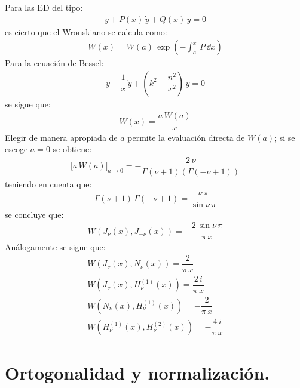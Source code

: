 Para las ED del tipo:
\begin{align*}
\ddot{y} + P(x) \, \dot{y} + Q(x) \, y = 0
\end{align*}
es cierto que el Wronskiano se calcula como:
\begin{align*}
W(x) = W(a) \, \exp(- \int_{a}^{x} \, P \, \dd x)
\end{align*}
Para la ecuación de Bessel:
\begin{align*}
\ddot{y} + \dfrac{1}{x} \, \dot{y} + \left( k^{2} - \dfrac{n^{2}}{x^{2}} \right) \, y = 0
\end{align*}
se sigue que:
\begin{align*}
W(x) = \dfrac{a \, W(a)}{x}
\end{align*}
Elegir de manera apropiada de $a$ permite la evaluación directa de $W(a)$; si se escoge $a=0$ se obtiene:
\begin{align*}
\big[ a \, W(a) \big]_{a \to 0} =  - \dfrac{2 \, \nu}{\Gamma(\nu + 1)(\Gamma (-\nu +1))}
\end{align*}
teniendo en cuenta que:
\begin{align*}
\Gamma (\nu + 1) \, \Gamma (-\nu + 1) = \dfrac{\nu \, \pi}{\sin \nu \,\pi }
\end{align*}
se concluye que:
\begin{align*}
W (J_{\nu} (x), J_{-\nu} (x)) = - \dfrac{2 \, \sin \nu \, \pi}{\pi \, x}
\end{align*}
Análogamente se sigue que:
\begin{align*}
W (J_{\nu} (x), N_{\nu} (x)) = \dfrac{2}{\pi \, x} \\[1em]
W (J_{\nu} (x), H_{\nu}^{(1)} (x)) =  \dfrac{2 \, i}{\pi \, x} \\[1em]
W (N_{\nu} (x), H_{\nu}^{(1)} (x)) = - \dfrac{2}{\pi \, x} \\[1em]
W (H_{\nu}^{(1)} (x), H_{\nu}^{(2)} (x)) = - \dfrac{4 \, i}{\pi \, x}
\end{align*}

\section{Ortogonalidad y normalización.}

